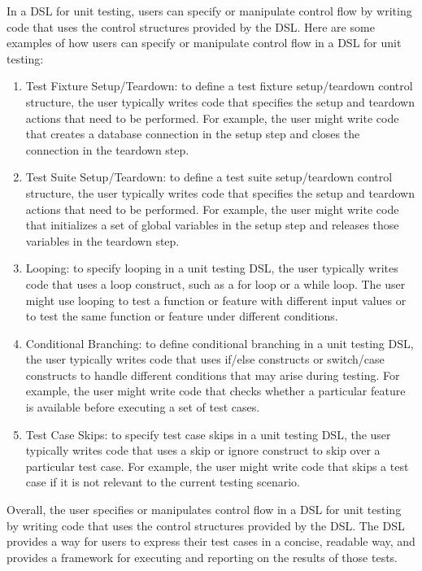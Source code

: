 In a DSL for unit testing, users can specify or manipulate control flow by writing code that uses the control structures provided by the DSL. Here are some examples of how users can specify or manipulate control flow in a DSL for unit testing:
\begin{enumerate}
   \item Test Fixture Setup/Teardown: to define a test fixture setup/teardown control structure, the user typically writes code that specifies the setup and teardown actions that need to be performed. For example, the user might write code that creates a database connection in the setup step and closes the connection in the teardown step.

   \item Test Suite Setup/Teardown: to define a test suite setup/teardown control structure, the user typically writes code that specifies the setup and teardown actions that need to be performed. For example, the user might write code that initializes a set of global variables in the setup step and releases those variables in the teardown step.

   \item Looping: to specify looping in a unit testing DSL, the user typically writes code that uses a loop construct, such as a for loop or a while loop. The user might use looping to test a function or feature with different input values or to test the same function or feature under different conditions.
   \item Conditional Branching: to define conditional branching in a unit testing DSL, the user typically writes code that uses if/else constructs or switch/case constructs to handle different conditions that may arise during testing. For example, the user might write code that checks whether a particular feature is available before executing a set of test cases.
   \item Test Case Skips: to specify test case skips in a unit testing DSL, the user typically writes code that uses a skip or ignore construct to skip over a particular test case. For example, the user might write code that skips a test case if it is not relevant to the current testing scenario.
   \end{enumerate}

Overall, the user specifies or manipulates control flow in a DSL for unit testing by writing code that uses the control structures provided by the DSL. The DSL provides a way for users to express their test cases in a concise, readable way, and provides a framework for executing and reporting on the results of those tests.


